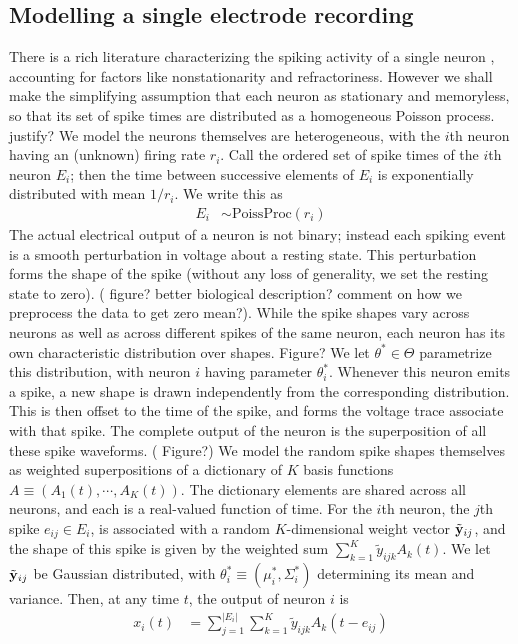 \subsection{Modelling a single electrode recording}
There is a rich literature characterizing the spiking activity of a single neuron \citep{}, accounting for factors like nonstationarity and
refractoriness. However we shall make the simplifying assumption that each neuron as stationary and memoryless, so that its set of spike times are 
distributed as a homogeneous Poisson process. 
{\color{red} justify?} We model the neurons themselves are heterogeneous, with the $i$th neuron having
an (unknown) firing rate $r_i$. Call the ordered set of spike times of the $i$th neuron $E_i$; then the time between successive elements of $E_i$ is 
exponentially distributed with mean $1/r_i$. We write this as
\begin{align}
  E_i &\sim \text{PoissProc}(r_i)
\end{align}
The actual electrical output of a neuron is not binary; instead each spiking event is a smooth perturbation in voltage about a
resting state. This perturbation forms the shape of the spike (without any loss of generality, we set the resting state to zero). 
{(\color{red} figure? better biological description? comment on how we preprocess the data to get zero mean?)}. 
While the spike shapes vary across neurons as well as across different spikes of the same neuron, each 
neuron has its own characteristic distribution over shapes. {\color{red} Figure? } 
We let $\theta^* \in \Theta$ parametrize this distribution, with neuron $i$ having parameter $\theta^*_i$. Whenever this neuron emits a 
spike, a new shape is drawn independently from the corresponding distribution. %
This is then offset to the time of the spike, and forms the voltage trace associate with that spike. The complete output of the neuron is the 
superposition of all these spike waveforms. 
{\color{red} ( Figure?)} %
We model the random spike shapes themselves as weighted superpositions of a dictionary of $K$ basis functions $A \equiv (A_1(t), \cdots, A_K(t))$. The
dictionary elements are shared across all neurons, and each is a real-valued function of time.
For the $i$th neuron, the $j$th spike $e_{ij} \in E_i$, is associated with a random $K$-dimensional weight vector $\tilde{\mathbf{y}}_{ij}$, and the 
shape of this spike is given by the weighted sum $\sum_{k=1}^K \tilde{y}_{ijk} A_k(t)$. We let $\tilde{\mathbf{y}}_{ij}$ be Gaussian distributed, with 
$\theta^*_i \equiv (\mu^*_i, \Sigma^*_i)$ determining its 
mean and variance. Then, at any time $t$, the output of neuron $i$ is
\begin{align}
  x_{i}(t) &= \sum_{j=1}^{|E_i|} \sum_{k=1}^K \tilde{y}_{ijk} A_k(t - e_{ij})
\end{align}

